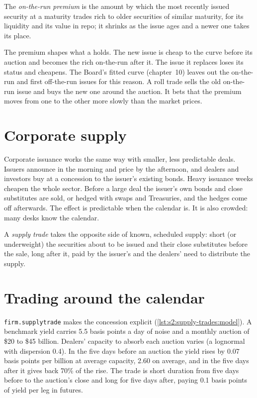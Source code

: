 \begin{definition}\label{def:s2:supply-trades:otr}
The \emph{on-the-run premium} is the amount by which the most recently issued security at a maturity trades rich to older
securities of similar maturity, for its liquidity and its value in repo; it shrinks as the issue ages and a newer one takes its place.
\end{definition}

The premium shapes what a  holds. The new issue is cheap to the curve before its auction and becomes the rich on-the-run after it. The
issue it replaces loses its status and cheapens. The Board's fitted curve (chapter~10) leaves out the on-the-run and first off-the-run issues for this
reason. A roll trade sells the old on-the-run issue and buys the new one around the auction. It bets that the premium moves from one to the other
more slowly than the market prices.

\section{Corporate supply}

Corporate issuance works the same way with smaller, less predictable deals. Issuers announce in the morning and price by the afternoon, and dealers
and investors buy at a concession to the issuer's existing bonds. Heavy issuance weeks cheapen the whole sector. Before a large deal the issuer's own
bonds and close substitutes are sold, or hedged with swaps and Treasuries, and the hedges come off afterwards. The effect is predictable when the
calendar is. It is also crowded: many desks know the calendar.

\begin{definition}\label{def:s2:supply-trades:trade}
A \emph{supply trade} takes the opposite side of known, scheduled supply: short (or underweight) the securities about to be issued
and their close substitutes before the sale, long after it, paid by the issuer's and the dealers' need to distribute the supply.
\end{definition}

\section{Trading around the calendar}

\texttt{firm.supplytrade} makes the concession explicit (\cref{lst:s2:supply-trades:model}). A benchmark yield carries 5.5 basis points a day of
noise and a monthly auction of \$20 to \$45 billion. Dealers' capacity to absorb each auction varies (a lognormal with dispersion 0.4). In the five
days before an auction the yield rises by 0.07 basis points per billion at average capacity, 2.60 on average, and in the five days after it gives back
70\% of the rise. The trade is short duration from five days before to the auction's close and long for five days after, paying 0.1 basis points of
yield per leg in futures.

